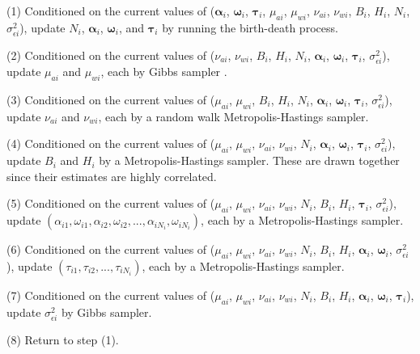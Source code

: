 \documentclass[11pt]{book}
\begin{document}
\noindent (1) Conditioned on the current values of ($\boldsymbol{\alpha}_i$, $\boldsymbol{\omega}_i$, $\boldsymbol{\tau}_i$, $\mu_{ai}$, $\mu_{wi}$, $\nu_{ai}$, $\nu_{wi}$, $B_i$, $H_i$, $N_i$, $\sigma_{\epsilon i}^2$), update $N_i$, $\boldsymbol{\alpha}_i$, $\boldsymbol{\omega}_i$, and $\boldsymbol{\tau}_i$ by running the birth-death process.

\noindent (2) Conditioned on the current values of ($\nu_{ai}$, $\nu_{wi}$, $B_i$, $H_i$, $N_i$, $\boldsymbol{\alpha}_i$, $\boldsymbol{\omega}_i$, $\boldsymbol{\tau}_i$, $\sigma_{\epsilon i}^2$), update $\mu_{ai}$ and $\mu_{wi}$, each by Gibbs sampler \cite{Geman}.

\noindent (3) Conditioned on the current values of ($\mu_{ai}$, $\mu_{wi}$, $B_i$, $H_i$, $N_i$, $\boldsymbol{\alpha}_i$, $\boldsymbol{\omega}_i$, $\boldsymbol{\tau}_i$, $\sigma_{\epsilon i}^2$), update $\nu_{ai}$ and $\nu_{wi}$, each by a random walk Metropolis-Hastings sampler.

\noindent (4) Conditioned on the current values of ($\mu_{ai}$, $\mu_{wi}$, $\nu_{ai}$, $\nu_{wi}$, $N_i$, $\boldsymbol{\alpha}_i$, $\boldsymbol{\omega}_i$, $\boldsymbol{\tau}_i$, $\sigma_{\epsilon i}^2$), update $B_i$ and $H_i$ by a Metropolis-Hastings sampler. These are drawn together since their estimates are highly correlated.

\noindent (5) Conditioned on the current values of ($\mu_{ai}$, $\mu_{wi}$, $\nu_{ai}$, $\nu_{wi}$, $N_i$, $B_i$, $H_i$, $\boldsymbol{\tau}_i$, $\sigma_{\epsilon i}^2$), update $(\alpha_{i1}, \omega_{i1}, \alpha_{i2}, \omega_{i2}, ... ,\alpha_{iN_i}, \omega_{iN_i})$, each by a Metropolis-Hastings sampler.

\noindent (6) Conditioned on the current values of ($\mu_{ai}$, $\mu_{wi}$, $\nu_{ai}$, $\nu_{wi}$, $N_i$, $B_i$, $H_i$, $\boldsymbol{\alpha}_i$, $\boldsymbol{\omega}_i$, $\sigma_{\epsilon i}^2$), update $(\tau_{i1},\tau_{i2},...,\tau_{iN_i})$, each by a Metropolis-Hastings sampler.

\noindent (7) Conditioned on the current values of ($\mu_{ai}$, $\mu_{wi}$, $\nu_{ai}$, $\nu_{wi}$, $N_i$, $B_i$, $H_i$, $\boldsymbol{\alpha}_i$, $\boldsymbol{\omega}_i$, $\boldsymbol{\tau}_i$), update $\sigma_{\epsilon i}^2$ by Gibbs sampler.

\noindent (8) Return to step (1).





\end{document}
